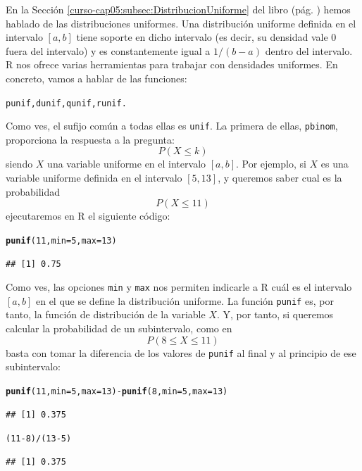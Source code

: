 \documentclass[10pt,a4paper]{article}\usepackage[]{graphicx}\usepackage[]{color}
\makeatletter
\newcommand{\hlnum}[1]{\textcolor[rgb]{0.686,0.059,0.569}{#1}}%
\newcommand{\hlopt}[1]{\textcolor[rgb]{0,0,0}{#1}}%
\newcommand{\hlstd}[1]{\textcolor[rgb]{0.345,0.345,0.345}{#1}}%
\newcommand{\hlkwc}[1]{\textcolor[rgb]{0.333,0.667,0.333}{#1}}%
\newcommand{\hlkwd}[1]{\textcolor[rgb]{0.737,0.353,0.396}{\textbf{#1}}}%
\newenvironment{kframe}{%
 \def\at@end@of@kframe{}%
 \ifinner\ifhmode%
  \def\at@end@of@kframe{\end{minipage}}%
  \begin{minipage}{\columnwidth}%
 \fi\fi%
 \def\FrameCommand##1{\hskip\@totalleftmargin \hskip-\fboxsep
 \colorbox{shadecolor}{##1}\hskip-\fboxsep
     \hskip-\linewidth \hskip-\@totalleftmargin \hskip\columnwidth}%
 \MakeFramed {\advance\hsize-\width
   \@totalleftmargin\z@ \linewidth\hsize
   \@setminipage}}%
 {\par\unskip\endMakeFramed%
 \at@end@of@kframe}
\newenvironment{knitrout}{}{} %
\makeatother
\begin{document}
En la Sección \ref{curso-cap05:subsec:DistribucionUniforme} del libro (pág. \pageref{curso-cap05:subsec:DistribucionUniforme}) hemos hablado de las distribuciones uniformes. Una distribución uniforme definida en el intervalo $[a,b]$ tiene soporte en dicho intervalo (es decir, su densidad vale $0$ fuera del intervalo) y es constantemente igual a $1/(b-a)$ dentro del intervalo. R nos ofrece varias herramientas para trabajar con densidades uniformes. En concreto, vamos a hablar de las funciones:
\begin{center}
  {\tt punif,\qquad dunif,\qquad qunif,\qquad runif.}
\end{center}
Como ves, el sufijo común a todas ellas es {\tt unif}. La primera de ellas, {\tt pbinom}, proporciona la respuesta a la pregunta:
\[P(X \leq k)\]
siendo $X$ una variable uniforme en el intervalo $[a,b]$. Por ejemplo, si $X$ es una variable uniforme definida en el intervalo $[5,13]$, y queremos saber cual es la probabilidad
\[P(X \leq 11)\]
ejecutaremos en R el siguiente código:
\begin{knitrout}
\color{fgcolor}\begin{kframe}
\begin{alltt}
\hlkwd{punif}\hlstd{(}\hlnum{11}\hlstd{,} \hlkwc{min} \hlstd{=} \hlnum{5}\hlstd{,} \hlkwc{max} \hlstd{=} \hlnum{13}\hlstd{)}
\end{alltt}
\begin{verbatim}
## [1] 0.75
\end{verbatim}
\end{kframe}
\end{knitrout}
Como ves, las opciones {\tt min} y {\tt max} nos permiten indicarle a R cuál es el intervalo $[a, b]$ en el que se define la distribución uniforme. La función {\tt punif} es, por tanto, la función de distribución de la variable $X$. Y, por tanto, si queremos calcular la probabilidad de un subintervalo, como en
\[P(8\leq X \leq 11)\]
basta con tomar la diferencia de los valores de {\tt punif} al final y al principio de ese subintervalo:
\begin{knitrout}
\color{fgcolor}\begin{kframe}
\begin{alltt}
\hlkwd{punif}\hlstd{(}\hlnum{11}\hlstd{,} \hlkwc{min} \hlstd{=} \hlnum{5}\hlstd{,} \hlkwc{max} \hlstd{=} \hlnum{13}\hlstd{)} \hlopt{-} \hlkwd{punif}\hlstd{(}\hlnum{8}\hlstd{,} \hlkwc{min} \hlstd{=} \hlnum{5}\hlstd{,} \hlkwc{max} \hlstd{=} \hlnum{13}\hlstd{)}
\end{alltt}
\begin{verbatim}
## [1] 0.375
\end{verbatim}
\begin{alltt}
\hlstd{(}\hlnum{11} \hlopt{-} \hlnum{8}\hlstd{)} \hlopt{/} \hlstd{(}\hlnum{13} \hlopt{-} \hlnum{5}\hlstd{)}
\end{alltt}
\begin{verbatim}
## [1] 0.375
\end{verbatim}
\end{kframe}
\end{knitrout}
\end{document}
